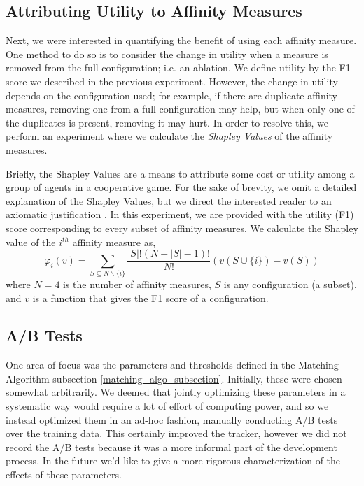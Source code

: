 \documentclass[10pt,twocolumn,letterpaper]{article}
\begin{document}
\label{attribution_experiment}
\subsection{Attributing Utility to Affinity Measures}
Next, we were interested in quantifying the benefit of using each affinity measure.
One method to do so is to consider the change in utility when a measure is removed from the full configuration; i.e. an ablation.
We define utility by the F1 score we described in the previous experiment.
However, the change in utility depends on the configuration used; for example, if there are duplicate affinity measures, removing one from a full configuration may help, but when only one of the duplicates is present, removing it may hurt.
In order to resolve this, we perform an experiment where we calculate the \textit{Shapley Values} \cite{shapley_s_1951} of the affinity measures.

Briefly, the Shapley Values are a means to attribute some cost or utility among a group of agents in a cooperative game.
For the sake of brevity, we omit a detailed explanation of the Shapley Values, but we direct the interested reader to an axiomatic justification \cite{shapley_s_1951}.
In this experiment, we are provided with the utility (F1) score corresponding to every subset of affinity measures.
We calculate the Shapley value of the $i^{th}$ affinity measure as,
$$ \varphi_{i}(v)=\sum_{S \subseteq N \backslash\{i\}} \frac{|S| !(N-|S|-1) !}{N !}(v(S \cup\{i\})-v(S)) $$
where $N=4$ is the number of affinity measures, $S$ is any configuration (a subset), and $v$ is a function that gives the F1 score of a configuration.

\subsection{A/B Tests}
One area of focus was the parameters and thresholds defined in the Matching Algorithm subsection \ref{matching_algo_subsection}.
Initially, these were chosen somewhat arbitrarily.
We deemed that jointly optimizing these parameters in a systematic way would require a lot of effort of computing power, and so we instead optimized them in an ad-hoc fashion, manually conducting A/B tests over the training data.
This certainly improved the tracker, however we did not record the A/B tests because it was a more informal part of the development process.
In the future we'd like to give a more rigorous characterization of the effects of these parameters.
\end{document}
